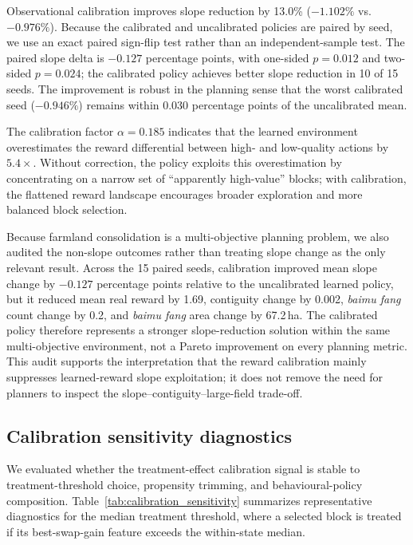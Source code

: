 \documentclass[11pt]{article}
\begin{document}
Observational calibration improves slope reduction by 13.0\% ($-1.102\%$ vs.\ $-0.976\%$). Because the calibrated and uncalibrated policies are paired by seed, we use an exact paired sign-flip test rather than an independent-sample test. The paired slope delta is $-0.127$ percentage points, with one-sided $p=0.012$ and two-sided $p=0.024$; the calibrated policy achieves better slope reduction in 10 of 15 seeds. The improvement is robust in the planning sense that the worst calibrated seed ($-0.946\%$) remains within 0.030 percentage points of the uncalibrated mean.

The calibration factor $\alpha = 0.185$ indicates that the learned environment overestimates the reward differential between high- and low-quality actions by $5.4\times$. Without correction, the policy exploits this overestimation by concentrating on a narrow set of ``apparently high-value'' blocks; with calibration, the flattened reward landscape encourages broader exploration and more balanced block selection.

Because farmland consolidation is a multi-objective planning problem, we also audited the non-slope outcomes rather than treating slope change as the only relevant result. Across the 15 paired seeds, calibration improved mean slope change by $-0.127$ percentage points relative to the uncalibrated learned policy, but it reduced mean real reward by 1.69, contiguity change by 0.002, \textit{baimu fang} count change by 0.2, and \textit{baimu fang} area change by 67.2\,ha. The calibrated policy therefore represents a stronger slope-reduction solution within the same multi-objective environment, not a Pareto improvement on every planning metric. This audit supports the interpretation that the reward calibration mainly suppresses learned-reward slope exploitation; it does not remove the need for planners to inspect the slope--contiguity--large-field trade-off.

\subsection{Calibration sensitivity diagnostics}
\label{sec:calibration_sensitivity}

We evaluated whether the treatment-effect calibration signal is stable to treatment-threshold choice, propensity trimming, and behavioural-policy composition. Table~\ref{tab:calibration_sensitivity} summarizes representative diagnostics for the median treatment threshold, where a selected block is treated if its best-swap-gain feature exceeds the within-state median.
\end{document}
